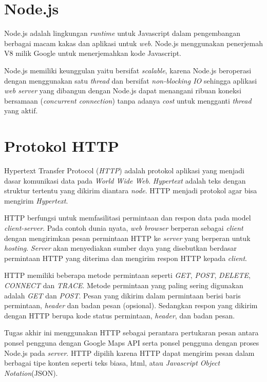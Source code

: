\section{Node.js}
Node.js adalah lingkungan \textit{runtime} untuk Javascript dalam pengembangan berbagai macam kakas dan aplikasi untuk \textit{web}. Node.js menggunakan penerjemah V8 milik Google untuk menerjemahkan kode Javascript.
\par
Node.js memiliki keunggulan yaitu bersifat \textit{scalable}, karena Node.js beroperasi dengan menggunakan satu \textit{thread} dan bersifat \textit{non-blocking IO} sehingga aplikasi \textit{web server} yang dibangun dengan Node.js dapat menangani ribuan koneksi bersamaan (\textit{concurrent connection}) tanpa adanya \textit{cost} untuk mengganti \textit{thread} yang aktif.  
\section{Protokol HTTP}
Hypertext Transfer Protocol (\textit{HTTP}) adalah protokol aplikasi yang menjadi dasar komunikasi data pada \textit{World Wide Web}. \textit{Hypertext} adalah teks dengan struktur tertentu yang dikirim diantara \textit{node}. HTTP menjadi protokol agar bisa mengirim \textit{Hypertext}.
\par
HTTP berfungsi untuk memfasilitasi permintaan dan respon data pada model \textit{client-server}. Pada contoh dunia nyata, \textit{web browser} berperan sebagai \textit{client} dengan mengirimkan pesan permintaan HTTP ke \textit{server} yang berperan untuk \textit{hosting}. \textit{Server} akan menyediakan sumber daya yang disebutkan berdasar permintaan HTTP yang diterima dan mengirim respon HTTP kepada \textit{client}.
\par
HTTP memiliki beberapa metode permintaan seperti \textit{GET}, \textit{POST}, \textit{DELETE}, \textit{CONNECT} dan \textit{TRACE}. Metode permintaan yang paling sering digunakan adalah \textit{GET} dan \textit{POST}. Pesan yang dikirim dalam permintaan berisi baris permintaan, \textit{header} dan badan pesan (opsional). Sedangkan respon yang dikirim dengan HTTP berupa kode status permintaan, \textit{header}, dan badan pesan.
\par
Tugas akhir ini menggunakan HTTP sebagai perantara pertukaran pesan antara ponsel pengguna dengan Google Maps API serta ponsel pengguna dengan proses Node.js pada \textit{server}. HTTP dipilih karena HTTP dapat mengirim pesan dalam berbagai tipe konten seperti teks biasa, html, atau \textit{Javascript Object Notation}(JSON).   

